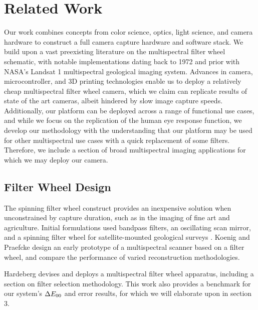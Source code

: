 \chapter{Related Work}
Our work combines concepts from color science, optics, light science, and camera hardware to construct a full camera capture hardware and software stack. 
We build upon a vast preexisting literature on the multispectral filter wheel schematic, with notable implementations dating back to 1972 and prior with NASA's Landsat 1 \cite{mannheimer1977landsat, USGSLandsat1} multispectral geological imaging system. 
Advances in camera, microcontroller, and 3D printing technologies enable us to deploy a relatively cheap multispectral filter wheel camera, which we claim can replicate results of state of the art cameras, albeit hindered by slow image capture speeds. 
Additionally, our platform can be deployed across a range of functional use cases, and while we focus on the replication of the human eye response function, we develop our methodology with the understanding that our platform may be used for other multispectral use cases with a quick replacement of some filters. 
Therefore, we include a section of broad multispectral imaging applications for which we may deploy our camera. 

\section{Filter Wheel Design}

The spinning filter wheel construct provides an inexpensive solution when unconstrained by capture duration, such as in the imaging of fine art and agriculture. 
Initial formulations used bandpass filters, an oscillating scan mirror, and a spinning filter wheel for satellite-mounted geological surveys \cite{USGS2012MSS}.
Koenig and Praefcke \cite{konig1998practice} design an early prototype of a multispectral scanner based on a filter wheel, and compare the performance of varied reconstruction methodologies.  

Hardeberg \cite{Filterselection} devises and deploys a multispectral filter wheel apparatus, including a section on filter selection methodology. 
This work also provides a benchmark for our system's $\Delta E_{00}$ and error results, for which we will elaborate upon in section 3. 

